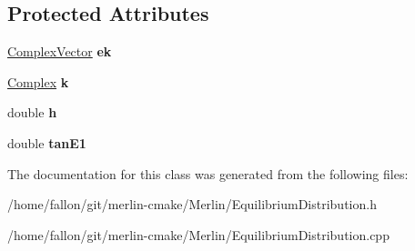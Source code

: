 \subsection*{Protected Attributes}
\begin{DoxyCompactItemize}
\item 
\mbox{\label{classIntegrateEigenvector_aed0a99ab5790a8b960dfbc8f3afe3f02}} 
\hyperlink{classTLAS_1_1Vector}{Complex\+Vector} {\bfseries ek}
\item 
\mbox{\label{classIntegrateEigenvector_ac10f027ab6ac39111e41955e813eec0c}} 
\hyperlink{classComplex}{Complex} {\bfseries k}
\item 
\mbox{\label{classIntegrateEigenvector_a7b139028e9c81df69d9e662247bbbc59}} 
double {\bfseries h}
\item 
\mbox{\label{classIntegrateEigenvector_a174147cdeb165de4f5fb4e22fa9b899b}} 
double {\bfseries tan\+E1}
\end{DoxyCompactItemize}


The documentation for this class was generated from the following files\+:\begin{DoxyCompactItemize}
\item 
/home/fallon/git/merlin-\/cmake/\+Merlin/Equilibrium\+Distribution.\+h\item 
/home/fallon/git/merlin-\/cmake/\+Merlin/Equilibrium\+Distribution.\+cpp\end{DoxyCompactItemize}
